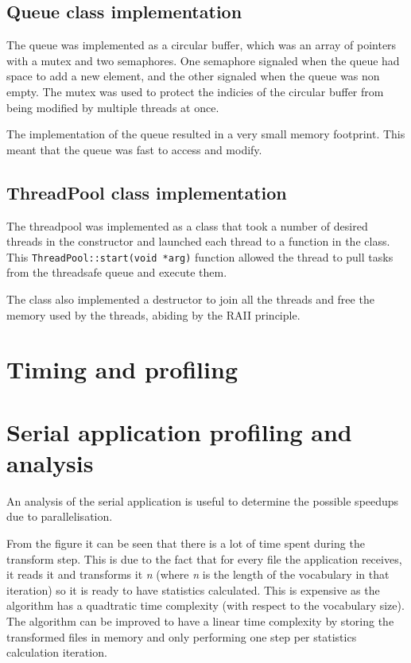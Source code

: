 \documentclass{article}
\begin{document}
\subsection{Queue class implementation}
The queue was implemented as a circular buffer, which was an array of pointers with a mutex and two semaphores. One semaphore signaled when 
the queue had space to add a new element, and the other signaled when the queue was non empty. The mutex was used
to protect the indicies of the circular buffer from being modified by multiple threads at once.

The implementation of the queue resulted in a very small memory footprint. This meant that the queue was 
fast to access and modify.

\subsection{ThreadPool class implementation}
The threadpool was implemented as a class that took a number of desired threads in the constructor and launched
each thread to a function in the class. This \texttt{ThreadPool::start(void *arg)} function allowed the
thread to pull tasks from the threadsafe queue and execute them.

The class also implemented a destructor to join all the threads and free the memory used by the threads, abiding
by the RAII principle.


\section{Timing and profiling}

\section{Serial application profiling and analysis}
An analysis of the serial application is useful to determine the possible speedups due to 
parallelisation. 


From the figure it can be seen that there is a lot of time spent during the transform step. This is 
due to the fact that for every file the application receives, it reads it and transforms it \textit{n} 
(where \textit{n} is the length of the vocabulary in that iteration) so it is ready to have statistics
calculated. This is expensive as the algorithm has a quadtratic time complexity (with respect to the 
vocabulary size). The algorithm can be improved to have a linear time complexity by storing the 
transformed files in memory and only performing one step per statistics calculation iteration.
\end{document}
